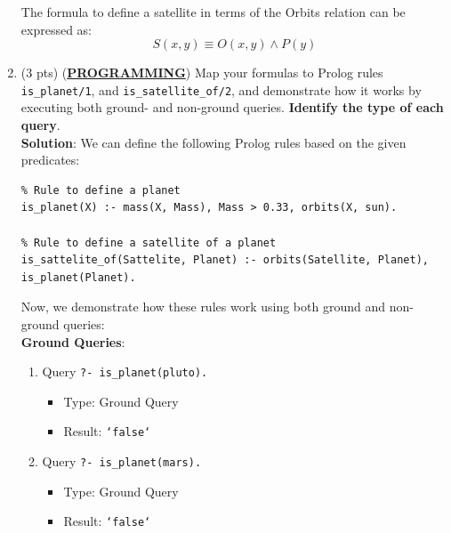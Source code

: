 \documentclass[12pt]{article}
\begin{document}
\begin{spacing}{1.5}
\begin{enumerate}
\begin{itemize}
		      \end{itemize}
		      		      		      		      		      		      		      		      		      
		      The formula to define a satellite in terms of the Orbits relation can be expressed as:
		      $$S(x,y) \equiv O(x,y) \land P(y)$$
		      		              
		\item 
		      (3 pts) (\uline{\textbf{PROGRAMMING}}) Map your formulas to Prolog rules \texttt{is\_planet/1}, and
		      \texttt{is\_satellite\_of/2}, and demonstrate how it works by executing both ground- and
		      non-ground queries. \textbf{Identify the type of each query}.\\
		      		      		      		      		      		      		      		      
		      \textbf{Solution}: We can define the following Prolog rules based on the given predicates:
		      		      		      		      		      		      		      		      
		      \begin{lstlisting}
% Rule to define a planet
is_planet(X) :- mass(X, Mass), Mass > 0.33, orbits(X, sun).

% Rule to define a satellite of a planet
is_sattelite_of(Sattelite, Planet) :- orbits(Satellite, Planet), is_planet(Planet).	          
		      \end{lstlisting}
		      		      		      		      		      		      		      		      
		      Now, we demonstrate how these rules work using both ground and non-ground queries:\\
		      		      		      		      		      		      		      		      
		      \textbf{Ground Queries}:
		      		      		      		      		      		      		      		      
		      \begin{enumerate}
		      	\item 
		      	      Query \texttt{?- is\_planet(pluto).}
		      	      \begin{itemize}
		      	      	\item Type: Ground Query
		      	      	\item Result: \texttt{`false`}
		      	      \end{itemize}
     
		      	\item 
		      	      Query \texttt{?- is\_planet(mars).}
		      	      \begin{itemize}
		      	      	\item Type: Ground Query
		      	      	\item Result: \texttt{`false`}
		      	      \end{itemize}
     

\end{enumerate}
\end{enumerate}
\end{spacing}
\end{document}
